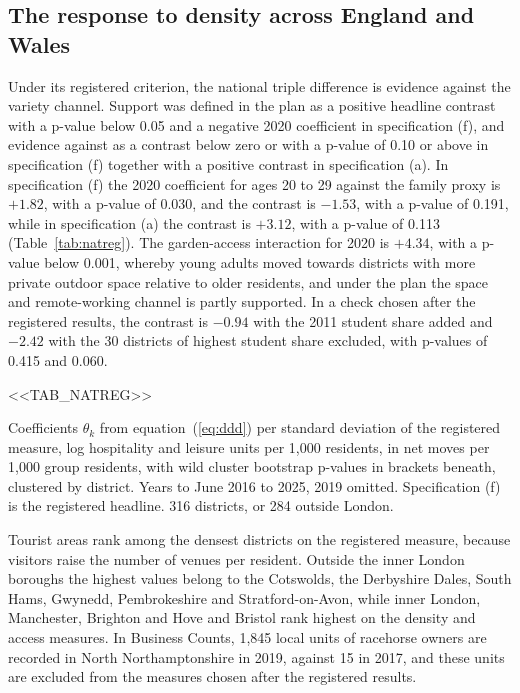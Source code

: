 \documentclass[11pt,a4paper]{article}
\newcommand{\tabnote}[1]{\par\smallskip\parbox{\linewidth}{\footnotesize #1}}
\begin{document}
\subsection{The response to density across England and Wales}\label{sec:national}

Under its registered criterion, the national triple difference is evidence against the variety channel. Support was defined in the plan as a positive headline contrast with a p-value below 0.05 and a negative 2020 coefficient in specification (f), and evidence against as a contrast below zero or with a p-value of 0.10 or above in specification (f) together with a positive contrast in specification (a). In specification (f) the 2020 coefficient for ages 20 to 29 against the family proxy is $+1.82$, with a p-value of 0.030, and the contrast is $-1.53$, with a p-value of 0.191, while in specification (a) the contrast is $+3.12$, with a p-value of 0.113 (Table~\ref{tab:natreg}). The garden-access interaction for 2020 is $+4.34$, with a p-value below 0.001, whereby young adults moved towards districts with more private outdoor space relative to older residents, and under the plan the space and remote-working channel is partly supported. In a check chosen after the registered results, the contrast is $-0.94$ with the 2011 student share added and $-2.42$ with the 30 districts of highest student share excluded, with p-values of 0.415 and 0.060.

\begin{table}[htbp]
\centering
\caption{Registered national triple difference, England and Wales}\label{tab:natreg}
\footnotesize
<<TAB_NATREG>>
\tabnote{Coefficients $\theta_k$ from equation~(\ref{eq:ddd}) per standard deviation of the registered measure, log hospitality and leisure units per 1,000 residents, in net moves per 1,000 group residents, with wild cluster bootstrap p-values in brackets beneath, clustered by district. Years to June 2016 to 2025, 2019 omitted. Specification (f) is the registered headline. 316 districts, or 284 outside London.}
\end{table}

Tourist areas rank among the densest districts on the registered measure, because visitors raise the number of venues per resident. Outside the inner London boroughs the highest values belong to the Cotswolds, the Derbyshire Dales, South Hams, Gwynedd, Pembrokeshire and Stratford-on-Avon, while inner London, Manchester, Brighton and Hove and Bristol rank highest on the density and access measures. In Business Counts, 1,845 local units of racehorse owners are recorded in North Northamptonshire in 2019, against 15 in 2017, and these units are excluded from the measures chosen after the registered results.
\end{document}
